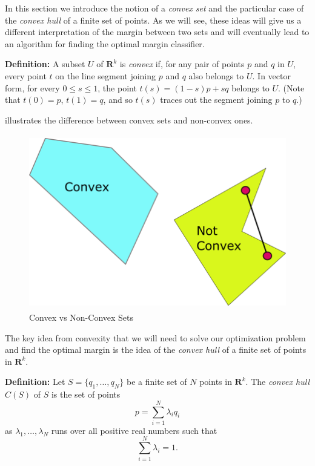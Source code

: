 \documentclass[
]{article}
\begin{document}
In this section we introduce the notion of a \emph{convex set} and the
particular case of the \emph{convex hull} of a finite set of points. As
we will see, these ideas will give us a different interpretation of the
margin between two sets and will eventually lead to an algorithm for
finding the optimal margin classifier.

\textbf{Definition:} A subset \(U\) of \(\mathbf{R}^{k}\) is
\emph{convex} if, for any pair of points \(p\) and \(q\) in \(U\), every
point \(t\) on the line segment joining \(p\) and \(q\) also belongs to
\(U\). In vector form, for every \(0\le s\le 1\), the point
\(t(s) = (1-s)p+sq\) belongs to \(U\). (Note that \(t(0)=p\),
\(t(1)=q\), and so \(t(s)\) traces out the segment joining \(p\) to
\(q\).)

 illustrates the difference between convex
sets and non-convex ones.

\begin{figure}
\hypertarget{fig:convexnotconvex}{%
\centering
\includegraphics[width=\textwidth,height=3in]{../img/ConvexNotConvex.png}
\caption{Convex vs Non-Convex Sets}\label{fig:convexnotconvex}
}
\end{figure}

The key idea from convexity that we will need to solve our optimization
problem and find the optimal margin is the idea of the \emph{convex
hull} of a finite set of points in \(\mathbf{R}^{k}\).

\textbf{Definition:} Let \(S=\{q_1,\ldots, q_{N}\}\) be a finite set of
\(N\) points in \(\mathbf{R}^{k}\). The \emph{convex hull} \(C(S)\) of
\(S\) is the set of points \[
p = \sum_{i=1}^{N} \lambda_{i}q_{i}
\] as \(\lambda_{1},\ldots,\lambda_{N}\) runs over all positive real
numbers such that \[
\sum_{i=1}^{N} \lambda_{i} = 1.
\]
\end{document}
